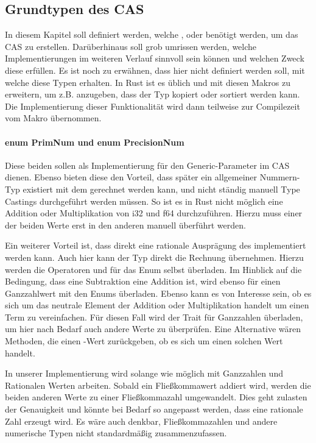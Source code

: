 \documentclass[11pt,a4paper, ngerman]{article}
\begin{document}
\subsection{Grundtypen des CAS}
In diesem Kapitel soll definiert werden, welche ,  oder  benötigt werden, um das CAS zu erstellen. Darüberhinaus soll grob umrissen werden, welche Implementierungen im weiteren Verlauf sinnvoll sein können und welchen Zweck diese erfüllen.
Es ist noch zu erwähnen, dass hier nicht definiert werden soll, mit welche  diese Typen erhalten. In Rust ist es üblich  und  mit diesen Makros zu erweitern, um z.B. anzugeben, dass der Typ kopiert oder sortiert werden kann. Die Implementierung dieser Funktionalität wird dann teilweise zur Compilezeit vom Makro übernommen.

\label{sec:NumTypes}
\paragraph{enum PrimNum und enum PrecisionNum} Diese beiden  sollen als Implementierung für den Generic-Parameter im CAS dienen. Ebenso bieten diese den Vorteil, dass später ein allgemeiner Nummern-Typ existiert mit dem gerechnet werden kann, und nicht ständig manuell Type Castings durchgeführt werden müssen. So ist es in Rust nicht möglich eine Addition oder Multiplikation von i32 und f64 durchzuführen. Hierzu muss einer der beiden Werte erst in den anderen manuell überführt werden.

Ein weiterer Vorteil ist, dass direkt eine rationale Ausprägung des  implementiert werden kann. Auch hier kann der Typ direkt die Rechnung übernehmen. Hierzu werden die Operatoren  und  für das Enum selbst überladen. Im Hinblick auf die Bedingung, dass eine Subtraktion eine Addition ist, wird ebenso  für einen Ganzzahlwert mit den Enums überladen. Ebenso kann es von Interesse sein, ob es sich um das neutrale Element der Addition oder Multiplikation handelt um einen Term zu vereinfachen. Für diesen Fall wird der Trait  für Ganzzahlen überladen, um hier nach Bedarf auch andere Werte zu überprüfen. Eine Alternative wären Methoden, die einen -Wert zurückgeben, ob es sich um einen solchen Wert handelt.

In unserer Implementierung wird  solange wie möglich mit Ganzzahlen und Rationalen Werten arbeiten. Sobald ein Fließkommawert addiert wird, werden die beiden anderen Werte zu einer Fließkommazahl umgewandelt. Dies geht zulasten der Genauigkeit und könnte bei Bedarf so angepasst werden, dass eine rationale Zahl erzeugt wird. Es wäre auch denkbar, Fließkommazahlen und andere numerische Typen nicht standardmäßig zusammenzufassen.
\end{document}
